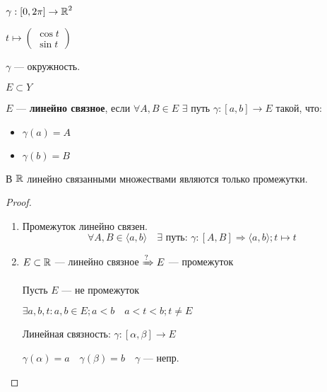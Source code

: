     \begin{example}
        $\gamma : [0, 2\pi]\to\operatorname*{\mathbb{R}}^2$

        $t\mapsto \begin{pmatrix}
            \cos t \\
            \sin t
        \end{pmatrix}$

        $\gamma$ --- окружность.
    \end{example}
    \begin{definition}
        $E\subset Y$

        $E$ --- \textbf{линейно связное}, если $\forall A,B\in E$
        $\exists$ путь $\gamma:[a,b]\to E$ такой, что:
        \begin{itemize}
            \item $\gamma(a)=A$
            \item $\gamma(b)=B$
        \end{itemize}
    \end{definition}
    \begin{lemma}
        В $\operatorname*{\mathbb{R}}$ линейно связанными множествами являются только промежутки.
    \end{lemma}
    \begin{proof}
        \begin{enumerate}
            \item Промежуток линейно связен.
            $$\forall A, B\in \langle a,b \rangle \quad \exists \text{ путь: } \gamma:[A,B]\Rightarrow \langle a,b \rangle; t\mapsto t$$
            \item $E\subset\operatorname*{\mathbb{R}}$ --- линейно связное $\xRightarrow{?} E$ --- промежуток
            
            Пусть $E$ --- не промежуток

            $\exists a,b,t : a,b\in E; a<b \quad a<t<b; t\not=E$

            Линейная связность: $\gamma:[\alpha, \beta]\to E$

            $\gamma(\alpha)=a \quad \gamma(\beta)=b \quad \gamma$ --- непр.
        \end{enumerate}
    \end{proof}

